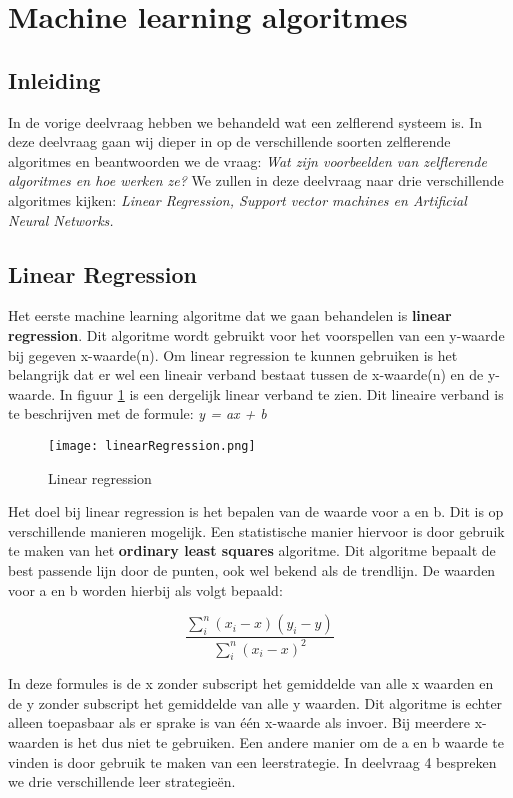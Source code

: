 \section{Machine learning algoritmes}

\subsection{Inleiding}
In de vorige deelvraag hebben we behandeld wat een zelflerend systeem is. In deze deelvraag gaan wij dieper in op de verschillende soorten zelflerende algoritmes en beantwoorden we de vraag: \textit{Wat zijn voorbeelden van zelflerende algoritmes en hoe werken ze?} We zullen in deze deelvraag naar drie verschillende algoritmes kijken: \textit{Linear Regression, Support vector machines en Artificial Neural Networks.} \cite{SunilRay} 

\subsection{Linear Regression}
Het eerste machine learning algoritme dat we gaan behandelen is \textbf{linear regression}. Dit algoritme wordt gebruikt voor het voorspellen van een y-waarde bij gegeven x-waarde(n). Om linear regression te kunnen gebruiken is het belangrijk dat er wel een lineair verband bestaat tussen de x-waarde(n) en de y-waarde. In figuur \ref{fig:LinearRegression1} is een dergelijk linear verband te zien. 
Dit lineaire verband is te beschrijven met de formule:
\textit{y = ax + b}

\begin{figure}[h]
  \centering
    \texttt{[image: linearRegression.png]}
  \caption{Linear regression}
  \label{fig:LinearRegression1}
\end{figure}

Het doel bij linear regression is het bepalen van de waarde voor a en b. Dit is op verschillende manieren mogelijk. Een statistische manier hiervoor is door gebruik te maken van het \textbf{ordinary least squares} algoritme. Dit algoritme bepaalt de best passende lijn door de punten, ook wel bekend als de trendlijn. De waarden voor a en b worden hierbij als volgt bepaald:

\[
	\frac{\sum_i^n(x_{i} - x)(y_{i} - y)}{\sum_i^n(x_{i} - x)^{2}}
\]

In deze formules is de x zonder subscript het gemiddelde van alle x waarden en de y zonder subscript het gemiddelde van alle y waarden. 
Dit algoritme is echter alleen toepasbaar als er sprake is van één x-waarde als invoer. Bij meerdere x-waarden is het dus niet te gebruiken. Een andere manier om de a en b waarde te vinden is door gebruik te maken van een leerstrategie. In deelvraag 4 bespreken we drie verschillende leer strategieën.

